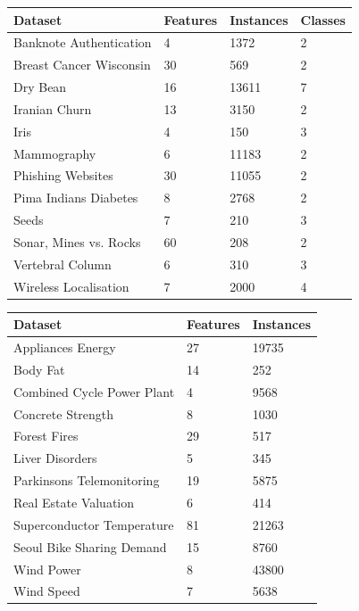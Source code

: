 \documentclass[
]{ceurart}
\theoremstyle{definition}
\begin{document}
\begin{table}
\centering
\begin{minipage}{0.45\textwidth}
\label{tab:cladata}
\footnotesize
\begin{tabular}{llll}\toprule
Dataset                               & Features & Instances  & Classes \\\midrule
Banknote Authentication    &  4 & 1372 & 2  \\
Breast Cancer Wisconsin    &  30 & 569 & 2 \\
Dry Bean                            &  16 & 13611 & 7 \\
Iranian Churn                    &  13 & 3150 & 2 \\
Iris                              &  4 & 150 & 3 \\
Mammography  & 6 & 11183 & 2 \\
Phishing Websites    &  30 & 11055 & 2 \\
Pima Indians Diabetes   &  8 & 2768 & 2 \\
Seeds                           &  7 & 210 & 3 \\
Sonar, Mines vs. Rocks       &  60 & 208 & 2 \\
Vertebral Column    &  6 & 310 & 3 \\
Wireless Localisation    &  7 & 2000 & 4 \\\bottomrule
\end{tabular}
\end{minipage}
\hfill
\begin{minipage}{0.45\textwidth}
\label{tab:regdata}
\footnotesize
\begin{tabular}{lll}\toprule
Dataset                               & Features & Instances   \\\midrule
Appliances Energy    &  27 & 19735   \\
Body Fat       &  14 & 252  \\
Combined Cycle Power Plant  & 4 & 9568  \\
Concrete Strength    &  8 & 1030  \\
Forest Fires    &  29 & 517  \\
Liver Disorders         &  5 & 345  \\
Parkinsons Telemonitoring          &  19 & 5875  \\
Real Estate Valuation    &  6 & 414  \\
Superconductor Temperature   &  81 & 21263  \\
Seoul Bike Sharing Demand    &  15 & 8760  \\
Wind Power                           &  8 & 43800  \\
Wind Speed    &  7 & 5638  \\\bottomrule
\end{tabular}
\end{minipage}
\end{table}
\end{document}
